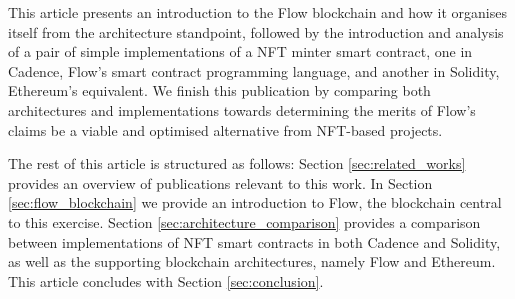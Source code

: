 \documentclass[../access.tex]{subfiles}
\begin{document}
\par
This article presents an introduction to the Flow blockchain and how it organises itself from the architecture standpoint, followed by the introduction and analysis of a pair of simple implementations of a NFT minter smart contract, one in Cadence, Flow's smart contract programming language, and another in Solidity, Ethereum's equivalent. We finish this publication by comparing both architectures and implementations towards determining the merits of Flow's claims be a viable and optimised alternative from NFT-based projects.
\par
The rest of this article is structured as follows: Section \ref{sec:related_works} provides an overview of publications relevant to this work. In Section \ref{sec:flow_blockchain} we provide an introduction to Flow, the blockchain central to this exercise. Section \ref{sec:architecture_comparison} provides a comparison between implementations of NFT smart contracts in both Cadence and Solidity, as well as the supporting blockchain architectures, namely Flow and Ethereum. This article concludes with Section \ref{sec:conclusion}.
\end{document}
